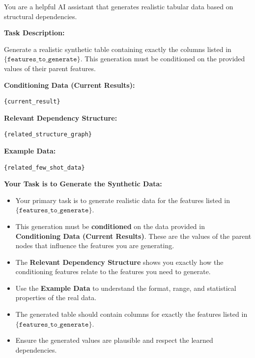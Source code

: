 \begin{tcolorbox}[
    float*=t, width=\textwidth, floatplacement=htbp,
    colback=blue!5!white,  %
    colframe=blue!75!black, %
    title={Prompt for Structure-Guided Data Synthesis ($\pi_\mathtt{data\_gen}$)}, %
    fonttitle=\bfseries\color{white}, %
    arc=2mm, %
    boxrule=1pt %
]
\small 

You are a helpful AI assistant that generates realistic tabular data based on structural dependencies.

\vspace{\medskipamount} %

\textbf{Task Description:}

Generate a realistic synthetic table containing exactly the columns listed in 
$\texttt{\{features\_to\_generate\}}$. This generation must be conditioned on the provided values 
of their parent features.

\vspace{\medskipamount} %

\textbf{Conditioning Data (Current Results):}
\begin{verbatim}
{current_result}
\end{verbatim}
\vspace{\medskipamount} %

\textbf{Relevant Dependency Structure:}
\begin{verbatim}
{related_structure_graph}
\end{verbatim}
\vspace{\medskipamount} %

\textbf{Example Data:}
\begin{verbatim}
{related_few_shot_data}
\end{verbatim}
\vspace{\medskipamount} %

\textbf{Your Task is to Generate the Synthetic Data:}
\begin{itemize}[leftmargin=*, itemsep=2pt]
    \item Your primary task is to generate realistic data for the features listed in $\texttt{\{features\_to\_generate\}}$.
    \item This generation must be \textbf{conditioned} on the data provided in \textbf{Conditioning Data (Current Results)}. These are the values of the parent nodes that influence the features you are generating.
    \item The \textbf{Relevant Dependency Structure} shows you exactly how the conditioning features relate to the features you need to generate.
    \item Use the \textbf{Example Data} to understand the format, range, and statistical properties of the real data.
    \item The generated table should contain columns for exactly the features listed in $\texttt{\{features\_to\_generate\}}$.
    \item Ensure the generated values are plausible and respect the learned dependencies.
\end{itemize}


\end{tcolorbox}

